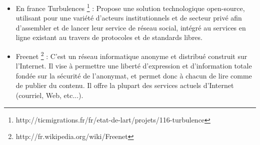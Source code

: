 \begin{itemize}
3) Si vous souhaitez déplacer les hosts vous aurez vos données et relations.
\begin{itemize}
\item Tent utilise https et JSON pour transporter les posts entre les serveurs et les applications.
\item Les entités sont les utilisateurs de Tent, ils autorisent des applications, établir des relations et lire/publier des posts les entités sont définie avec leur entité URL; https/http URL liée aux métadonnées.
\item Chaque entité a un ou plusieurs serveur qui la représente.
\item Les posts sont les atomics unité de contenu dans tent chaque post est un JSON, ils ont des fichiers attacher.
\item Tent c'est une machine de lécture en JSON api, les apps doivent être autorisée avec oauth2.
\item relationShips : Les entités établissent des relations lorsque il envoient des messages qui mentionnent d'autres entités. 
\end{itemize}
\subparagraph{}
Les fonctionnalités trouvées aussi sur les sites d'information communautaires comme \textit{hacker news} \footnote{http://thehackernews.com/} peuvent être reproduite avec tent, mais nécessairement architecturée d'une manière différente. les messages et les commentaires sont situé sur le serveur tent au lieu d'être regroupé sur un site unique ou base de donnée. 
\subparagraph{}
Les données sont stockées dans tent comme messages. Messages, comme les fichiers, sont tapés. Il y a un petit nombre de types de poste prévues par le protocole que les serveurs utilisent des tentes. Les développeurs sont libres de créer de nouveaux types de poste pour le contenu / stockage de données.
\newline
\item En france Turbulences \footnote{http://ticmigrations.fr/fr/etat-de-lart/projets/116-turbulence} : Propose une solution technologique open-source, utilisant pour une variété d'acteurs institutionnels et de secteur privé afin d'assembler et de lancer leur service de réseau social, intégré au services en ligne existant au travers de protocoles et de standards libres.
\newline
\item Freenet \footnote{http://fr.wikipedia.org/wiki/Freenet} : C'est un réseau informatique anonyme et distribué construit sur l'Internet. Il vise à permettre une liberté d'expression et d'information totale fondée sur la sécurité de l'anonymat, et permet donc à chacun de lire comme de publier du contenu. Il offre la plupart des services actuels d'Internet (courriel, Web, etc...). 
\end{itemize}
\newpage
